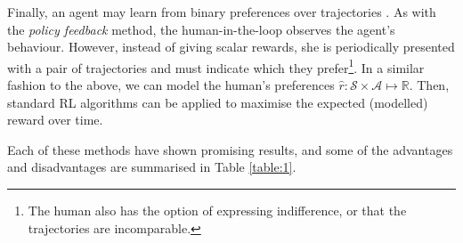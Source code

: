 \documentclass[11pt, a4paper, bibliography=totoc]{report}
\newcommand{\reals}{\mathbb{R}}
\begin{document}
Finally, an agent may learn from binary preferences over trajectories \cite{Wilson2012, Christiano2017}. As with the \textit{policy feedback} method, the human-in-the-loop observes the agent's behaviour. However, instead of giving scalar rewards, she is periodically presented with a pair of trajectories and must indicate which they prefer\footnote{The human also has the option of expressing indifference, or that the trajectories are incomparable.}. In a similar fashion to the above, we can model the human's preferences $ \hat{r} : \mathcal{S} \times \mathcal{A} \mapsto \reals $. Then, standard RL algorithms can be applied to maximise the expected (modelled) reward over time.

Each of these methods have shown promising results, and some of the advantages and disadvantages are summarised in Table \ref{table:1}.
\end{document}
